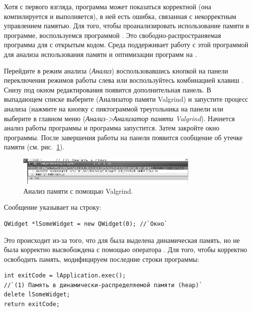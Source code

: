 Хотя с первого взгляда, программа может показаться корректной (она компилируется и выполняется), в ней есть ошибка,
связанная с некорректным управлением памятью. Для того, чтобы проанализировать использование памяти в программе,
воспользуемся программой . Это свободно-распространяемая программа для  с открытым кодом.
Среда  поддерживает работу с этой программой для анализа использования памяти 
и оптимизации программ на .

Перейдите в режим анализа  (\emph{Анализ}) воспользовавшись кнопкой на панели
переключения режимов работы слева или воспользуйтесь комбинацией клавиш . Снизу под окном
редактирования появится дополнительная панель. В выпадающем списке выберите  (Анализатор памяти
Valgrind) и запустите процесс анализа (нажмите на кнопку с пиктограммой треугольника на панели или выберите в главном
меню  (\emph{Анализ->Анализатор памяти Valgrind}). Начнется анализ работы программы и программа запустится. Затем закройте окно программы. После
завершения работы на панели появится сообщение об утечке памяти (см. рис.~\ref{ch14:refDrawing0}).
\begin{figure}[htb]
\begin{center}
\includegraphics[width=0.8\textwidth]{img/ris_14_1}
\caption[Анализ памяти с помощью Valgrind]{Анализ памяти с помощью Valgrind.}
\label{ch14:refDrawing0}
\end{center}
\end{figure}

Сообщение указывает на строку: 
\begin{lstlisting}
QWidget *lSomeWidget = new QWidget(0); //`Окно`
\end{lstlisting}

Это происходит из-за того, что для  была выделена динамическая память, но не была корректно
высвобождена с помощью оператора . Для того, чтобы корректно освободить память, модифицируем последние
строки программы:
\begin{lstlisting}
int exitCode = lApplication.exec();
//`(1) Память в динамически-распределяемой памяти (heap)`
delete lSomeWidget;
return exitCode;
\end{lstlisting}

